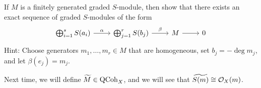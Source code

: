\begin{exercise}
  If $M$ is a finitely generated
  graded $S$-module, then show that
  there exists
  an exact sequence of graded
  $S$-modules of the form
  \[
    \begin{tikzcd}
      \bigoplus_{i = 1}^s S(a_i)
      \ar[r, "\alpha"] & \bigoplus_{j = 1}^r S(b_j)
      \ar[r, "\beta"] & M \ar[r] & 0
    \end{tikzcd}
  \]
  Hint: Choose generators $m_1, \dots, m_r \in M$
  that are homogeneous, set
  $b_j = - \deg m_j$,
  and let $\beta(e_j) = m_j$.
\end{exercise}

\begin{remark}
  Next time, we will define
  $\widetilde{M} \in \operatorname{QCoh}_X$, and we will
  see that $\widetilde{S(m)} \cong \mathcal{O}_X(m)$.
\end{remark}
